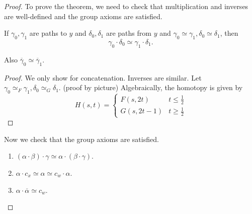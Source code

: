 \documentclass[a4paper]{article}
\begin{document}
\begin{proof}
  To prove the theorem, we need to check that multiplication and inverses are well-defined and the group axioms are satisfied.

  \begin{lemma}
    If \(\gamma_0, \gamma_1\) are paths to \(y\) and \(\delta_0, \delta_1\) are paths from \(y\) and \(\gamma_0 \simeq \gamma_1, \delta_0 \simeq \delta_1\), then
    \[
      \gamma_0 \cdot \delta_0 \simeq \gamma_1 \cdot \delta_1.
    \]

    Also \(\overline \gamma_0 \simeq \overline \gamma_1\).
  \end{lemma}

  \begin{proof}
    We only show for concatenation. Inverses are similar. Let \(\gamma_0 \simeq_F \gamma_1, \delta_0 \simeq_G \delta_1\). (proof by picture) Algebraically, the homotopy is given by
    \[
      H(s, t) =
      \begin{cases}
        F(s, 2t) & t \leq \frac{1}{2} \\
        G(s, 2t - 1) & t \geq \frac{1}{2}
      \end{cases}
    \]
  \end{proof}

  Now we check that the group axioms are satisfied.

  \begin{lemma}\leavevmode
    \begin{enumerate}
    \item \((\alpha \cdot \beta) \cdot \gamma \simeq \alpha \cdot (\beta \cdot \gamma)\).
    \item \(\alpha \cdot c_x \simeq \alpha \simeq c_w \cdot \alpha\).
    \item \(\alpha \cdot \overline \alpha \simeq c_w\).
    \end{enumerate}
  \end{lemma}


\end{proof}
\end{document}
